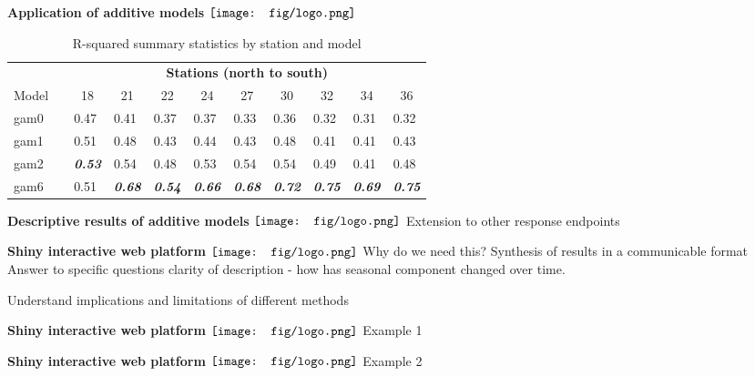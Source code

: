 \documentclass{beamer}
\newcommand{\emtxt}[1]{\textbf{\textit{{\color{mypal4} #1}}}}
\begin{document}
\begin{frame}{\textbf{Application of additive models} \hspace{0pt plus 1 filll} $\vcenter{\hbox{\texttt{[image: fig/logo.png]}}}$}
\begin{table}[!tbp]
{\tiny
\caption{R-squared summary statistics by station and model\label{totab}} 
\begin{center}
\begin{tabular}{lclllllllll}
\hline\hline
\multicolumn{1}{c}{\bfseries }&\multicolumn{1}{c}{\bfseries }&\multicolumn{9}{c}{\bfseries Stations (north to south)}\tabularnewline
\cline{3-11}
\multicolumn{1}{c}{Model}&\multicolumn{1}{c}{}&\multicolumn{1}{c}{18}&\multicolumn{1}{c}{21}&\multicolumn{1}{c}{22}&\multicolumn{1}{c}{24}&\multicolumn{1}{c}{27}&\multicolumn{1}{c}{30}&\multicolumn{1}{c}{32}&\multicolumn{1}{c}{34}&\multicolumn{1}{c}{36}\tabularnewline
\hline
gam0&&0.47&0.41&0.37&0.37&0.33&0.36&0.32&0.31&0.32\tabularnewline
gam1&&0.51&0.48&0.43&0.44&0.43&0.48&0.41&0.41&0.43\tabularnewline
gam2&&\emtxt{0.53}&0.54&0.48&0.53&0.54&0.54&0.49&0.41&0.48\tabularnewline
gam6&&0.51&\emtxt{0.68}&\emtxt{0.54}&\emtxt{0.66}&\emtxt{0.68}&\emtxt{0.72}&\emtxt{0.75}&\emtxt{0.69}&\emtxt{0.75}\tabularnewline
\hline
\end{tabular}\end{center}}
\end{table}\end{frame}

\begin{frame}{\textbf{Descriptive results of additive models} \hspace{0pt plus 1 filll} $\vcenter{\hbox{\texttt{[image: fig/logo.png]}}}$}
Extension to other response endpoints
\end{frame}

\begin{frame}{\textbf{Shiny interactive web platform} \hspace{0pt plus 1 filll} $\vcenter{\hbox{\texttt{[image: fig/logo.png]}}}$}
Why do we need this?
Synthesis of results in a communicable format
Answer to specific questions
clarity of description - how has seasonal component changed over time.

Understand implications and limitations of different methods
\end{frame}
\begin{frame}{\textbf{Shiny interactive web platform} \hspace{0pt plus 1 filll} $\vcenter{\hbox{\texttt{[image: fig/logo.png]}}}$}
Example 1
\end{frame}

\begin{frame}{\textbf{Shiny interactive web platform} \hspace{0pt plus 1 filll} $\vcenter{\hbox{\texttt{[image: fig/logo.png]}}}$}
Example 2
\end{frame}
\end{document}
